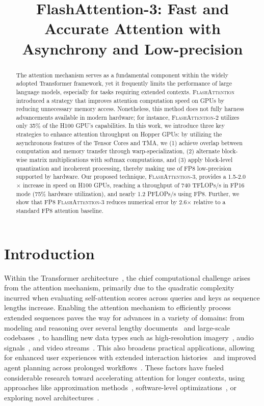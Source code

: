 \title{FlashAttention-3: Fast and Accurate Attention with Asynchrony and Low-precision}

\begin{abstract}
The attention mechanism serves as a fundamental component within the widely adopted Transformer framework, yet it frequently limits the performance of large language models, especially for tasks requiring extended contexts.
\textsc{FlashAttention} introduced a strategy that improves attention computation speed on GPUs by reducing unnecessary memory access. Nonetheless, this method does not fully harness advancements available in modern hardware; for instance, \textsc{FlashAttention-2} utilizes only 35\% of the H100 GPU's capabilities. In this work, we introduce three key strategies to enhance attention throughput on Hopper GPUs: by utilizing the asynchronous features of the Tensor Cores and TMA, we (1) achieve overlap between computation and memory transfer through warp-specialization, (2) alternate block-wise matrix multiplications with softmax computations, and (3) apply block-level quantization and incoherent processing, thereby making use of FP8 low-precision supported by hardware. Our proposed technique, \textsc{FlashAttention-3}, provides a 1.5-2.0$\times$ increase in speed on H100 GPUs, reaching a throughput of 740 TFLOPs/s in FP16 mode (75\% hardware utilization), and nearly 1.2 PFLOPs/s using FP8. Further, we show that FP8 \textsc{FlashAttention-3} reduces numerical error by 2.6$\times$ relative to a standard FP8 attention baseline.
\end{abstract}

\section{Introduction}
\label{sec:intro}

Within the Transformer architecture~\citep{vaswani2017attention}, the chief computational challenge arises from the attention mechanism, primarily due to the quadratic complexity incurred when evaluating self-attention scores across queries and keys as sequence lengths increase. Enabling the attention mechanism to efficiently process extended sequences paves the way for advances in a variety of domains: from modeling and reasoning over several lengthy documents~\citep{guo2021longt5,shaham2022scrolls,peng2023yarn} and large-scale codebases~\citep{roziere2023code, li2023starcoder}, to handling new data types such as high-resolution imagery~\citep{chen2022scaling}, audio signals~\citep{gulati2020conformer}, and video streams~\citep{ho2022video}. This also broadens practical applications, allowing for enhanced user experiences with extended interaction histories~\citep{sun2019bert4rec} and improved agent planning across prolonged workflows~\citep{yao2022react}. These factors have fueled considerable research toward accelerating attention for longer contexts, using approaches like approximation methods~\citep{katharopoulos2020transformers,choromanski2020rethinking, tay2020efficient}, software-level optimizations~\citep{rabe2021self,dao2022flashattention,kwon2023efficient}, or exploring novel architectures~\citep{peng2023rwkv,sun2023retentive,gu2023mamba}.

